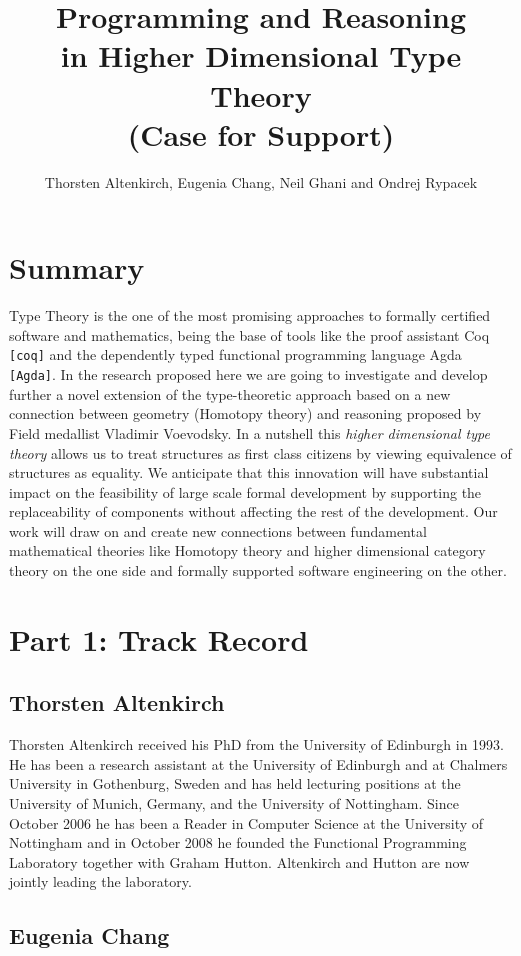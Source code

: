 \documentclass[a4paper]{article}
\title{Programming and Reasoning\\ in Higher Dimensional Type Theory \\
\LARGE (Case for Support)}
\author{Thorsten Altenkirch, Eugenia Chang, Neil Ghani and Ondrej Rypacek}
\date{}
\renewcommand{\cite}[1]{{\tt[#1]}}
\begin{document}
\raggedright
\sffamily

\maketitle
\section*{Summary}
Type Theory is the one of the most promising approaches to formally
certified software and mathematics, being the base of tools like the
proof assistant Coq \cite{coq} and the dependently typed functional
programming language Agda \cite{Agda}. In the research proposed here
we are going to investigate and develop further a novel extension of
the type-theoretic approach based on a new connection between geometry
(Homotopy theory) and reasoning proposed by Field medallist Vladimir
Voevodsky. In a nutshell this \emph{higher dimensional type theory}
allows us to treat structures as first class citizens by viewing
equivalence of structures as equality. We anticipate that this
innovation will have substantial impact on the feasibility of large scale
formal development by supporting the replaceability of components
without affecting the rest of the development. Our work will draw on
and create new connections between fundamental mathematical theories
like Homotopy theory and higher dimensional category theory on the one
side and formally supported software engineering on the other.


\section*{Part 1: Track Record}

\subsection*{Thorsten Altenkirch}
Thorsten Altenkirch received his PhD from the University of
Edinburgh in 1993. He has been a research assistant at the University of
Edinburgh and at Chalmers University in Gothenburg, Sweden and has
held lecturing positions at the University of Munich, Germany, and the
University of Nottingham. Since October 2006 he has been a Reader in
Computer Science at the University of Nottingham and in October
2008 he founded the Functional Programming Laboratory together with
Graham Hutton. Altenkirch and Hutton are now jointly leading the
laboratory.


\subsection*{Eugenia Chang}
\end{document}
